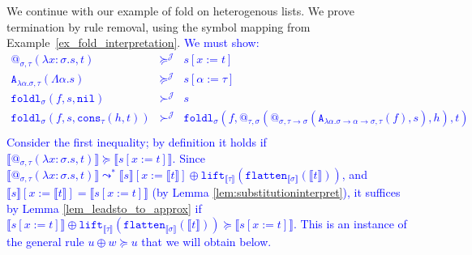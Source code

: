 \documentclass[a4paper,UKenglish,cleveref,autoref,numberwithinsect]{lipics-v2019}
\theoremstyle{definition}
\newcommand{\arrtype}{\rightarrow}
\newcommand{\abs}[2]{\lambda #1.#2}
\newcommand{\tabs}[2]{\Lambda #1.#2}
\newcommand{\arrW}{\leadsto}
\newcommand{\flatten}{\mathtt{flatten}}
\newcommand{\lift}{\mathtt{lift}}
\newcommand{\typeinterpret}[1]{\llbracket #1 \rrbracket}
\newcommand{\interpret}[1]{\llbracket #1 \rrbracket}
\newcommand{\Termmap}{\mathcal{J}}
\newcommand{\succinterpret}{\succ^{\Termmap}}
\newcommand{\succeqinterpret}{\succeq^{\Termmap}}
\newcommand{\nil}{\mathtt{nil}}
\newcommand{\cons}{\mathtt{cons}}
\newcommand{\CKchange}[1]{\textcolor{blue}{#1}}
\begin{document}
\begin{example}\label{ex_fold_intermediate}
  We continue with our example of fold on heterogenous lists. We prove
  termination by rule removal, using the symbol mapping from
  Example~\ref{ex_fold_interpretation}.
  \CKchange{We must show:
  \[
  \begin{array}{rcl}
    @_{\sigma,\tau}(\abs{x:\sigma}{s},t) & \succeqinterpret & s[x:=t] \\
    \mathtt{A}_{\abs{\alpha}{\sigma},\tau}(\tabs{\alpha}{s}) &
      \succeqinterpret & s[\alpha:=\tau] \\
    \mathtt{foldl}_\sigma(f,s,\nil) & \succinterpret & s \\
    \mathtt{foldl}_\sigma(f,s,\cons_\tau(h,t)) & \succinterpret &
    \mathtt{foldl}_\sigma(f,@_{\tau,\sigma}(@_{\sigma,\tau
    \arrtype\sigma}(
      \mathtt{A}_{\abs{\alpha}{\sigma\arrtype\alpha\arrtype\sigma},
      \tau}(f),s),h),t) \\
  \end{array}
  \]
Consider the first inequality; by definition it holds if
$\interpret{@_{\sigma,\tau}(\abs{x:\sigma}{s},t)} \succeq
\interpret{s[x:=t]}$.
Since $\interpret{@_{\sigma,\tau}(\abs{x:
\sigma}{s},t)} \arrW^* \interpret{s}[x:=\interpret{t}] \oplus
\lift_{\typeinterpret{\tau}}(\flatten_{\typeinterpret{\sigma}}(
\interpret{t}))$, and $\interpret{s}[x:=\interpret{t}] =
\interpret{s[x:=t]}$ (by Lemma \ref{lem:substitutioninterpret}),
it suffices by Lemma \ref{lem_leadsto_to_approx} if
$\interpret{s[x:=t]} \oplus \lift_{\typeinterpret{\tau}}(\flatten_{\typeinterpret{\sigma}}(
\interpret{t})) \succeq \interpret{s[x:=t]}$.
This is an instance of the general rule $u \oplus w \succeq u$ that
we will obtain below.}
\end{example}
\end{document}
